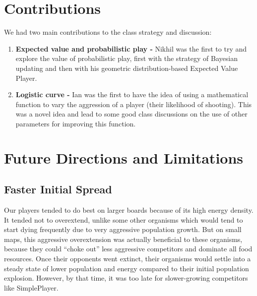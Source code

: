 \documentclass[
10pt, %
letterpaper, %
oneside, %
headinclude,footinclude, %
english
]{article}
\begin{document}
\section{Contributions}

We had two main contributions to the class strategy and discussion:
\begin{enumerate}
  \item \textbf{Expected value and probabilistic play -} Nikhil was the first to try and explore the value of probabilistic play, first with the strategy of Bayesian updating and then with his geometric distribution-based Expected Value Player.
  \item \textbf{Logistic curve -} Ian was the first to have the idea of using a mathematical function to vary the aggression of a player (their likelihood of shooting). This was a novel idea and lead to some good class discussions on the use of other parameters for improving this function.
\end{enumerate}

\section{Future Directions and Limitations}

\subsection{Faster Initial Spread}

Our players tended to do best on larger boards because of its high energy density. It tended not to overextend, unlike some other organisms which would tend to start dying frequently due to very aggressive population growth. But on small maps, this aggressive overextension was actually beneficial to these organisms, because they could ``choke out'' less aggressive competitors and dominate all food resources. Once their opponents went extinct, their organisms would settle into a steady state of lower population and energy compared to their initial population explosion. However, by that time, it was too late for slower-growing competitors like SimplePlayer.
\end{document}
